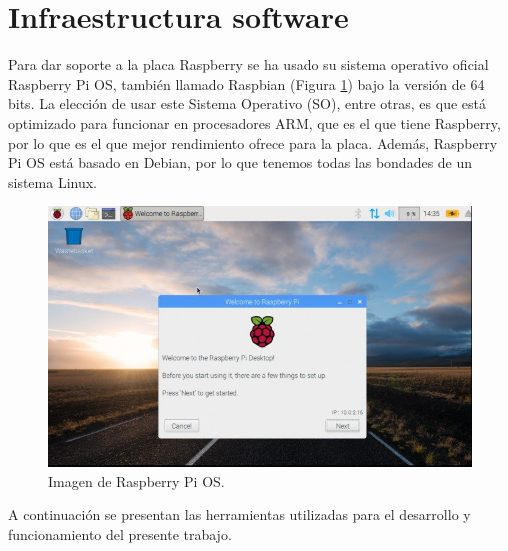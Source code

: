 \section{Infraestructura software}
Para dar soporte a la placa Raspberry se ha usado su sistema operativo oficial Raspberry Pi OS, también llamado Raspbian (Figura \ref{fig:raspbian}) bajo la versión de 64 bits. La elección de usar este Sistema Operativo (SO), entre otras, es que está optimizado para funcionar en procesadores ARM, que es el que tiene Raspberry, por lo que es el que mejor rendimiento ofrece para la placa. Además, Raspberry Pi OS está basado en Debian, por lo que tenemos todas las bondades de un sistema Linux.\\
\begin{figure} [h!]
  \begin{center}
    \includegraphics[width=14cm]{figs/raspbian}
  \end{center}
  \caption{Imagen de Raspberry Pi OS.}
  \label{fig:raspbian}
\end{figure}

A continuación se presentan las herramientas utilizadas para el desarrollo y funcionamiento del presente trabajo.

